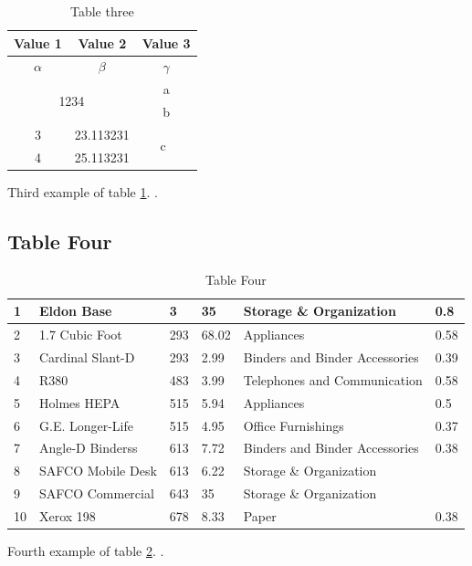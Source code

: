 \begin{table}[!h]
  \centering
  \label{tab:table3}
  \begin{tabular}{|c|c|c|}
    \hline
    \textbf{Value 1}                            & \textbf{Value 2} & \textbf{Value 3}    \\
    \hline
    $\alpha$                                    & $\beta$          & $\gamma$            \\
    \hline
    \multicolumn{2}{|c|}{\multirow{2}{*}{1234}} & a                                      \\
    \cline{3-3}
    \multicolumn{2}{|c|}{}                      & b                                      \\
    \hline
    3                                           & 23.113231        & \multirow{2}{*}{c~} \\
    \cline{1-2}
    4                                           & 25.113231        &                     \\
    \hline
  \end{tabular}
  \caption{Table three}
  \label{Tab:tablethree}
\end{table}
Third example of table \ref{Tab:tablethree}.
\lipsum[1-1].
\subsection{Table Four}
\begin{table}[!h]
  \centering
  \begin{tabular}{|l|l|l|l|l|l|}
    \hline
    1  & Eldon Base        & 3   & 35    & Storage \& Organization        & 0.8  \\ \hline
    2  & 1.7 Cubic Foot    & 293 & 68.02 & Appliances                     & 0.58 \\ \hline
    3  & Cardinal Slant-D  & 293 & 2.99  & Binders and Binder Accessories & 0.39 \\ \hline
    4  & R380              & 483 & 3.99  & Telephones and Communication   & 0.58 \\ \hline
    5  & Holmes HEPA       & 515 & 5.94  & Appliances                     & 0.5  \\ \hline
    6  & G.E. Longer-Life  & 515 & 4.95  & Office Furnishings             & 0.37 \\ \hline
    7  & Angle-D Binderss  & 613 & 7.72  & Binders and Binder Accessories & 0.38 \\ \hline
    8  & SAFCO Mobile Desk & 613 & 6.22  & Storage \& Organization        & ~    \\ \hline
    9  & SAFCO Commercial  & 643 & 35    & Storage \& Organization        & ~    \\ \hline
    10 & Xerox 198         & 678 & 8.33  & Paper                          & 0.38 \\ \hline
  \end{tabular}
  \caption{Table Four}
  \label{Tab:tablefour}
\end{table}
Fourth example of table \ref{Tab:tablefour}.
\lipsum[1-1].
